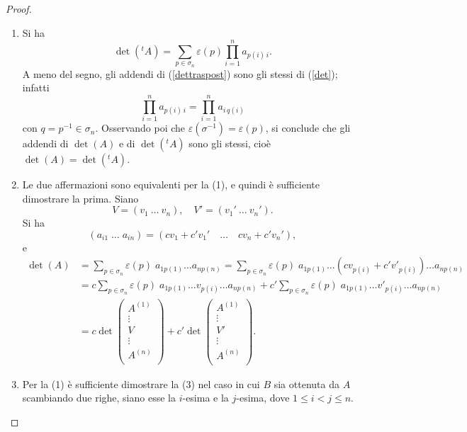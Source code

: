 \documentclass{article}
\theoremstyle{plain}
\theoremstyle{definition}
\theoremstyle{remark}
\begin{document}
\begin{proof}\hfill
    \begin{enumerate}
        \item Si ha 
        \begin{equation}\label{dettraspost}
            \det( ^{t}A)=\sum_{p\in\sigma_n}\varepsilon(p)\prod_{i=1}^{n}a_{p(i)\,i}.
        \end{equation}
        A meno del segno, gli addendi di (\ref{dettraspost}) sono gli stessi di (\ref{det}); infatti
        \[\prod_{i=1}^{n}a_{p(i)\,i}=\prod_{i=1}^{n}a_{i\,q(i)}\]
        con $q=p^{-1}\in\sigma_n$. 
        Osservando poi che $\varepsilon(\sigma^{-1})=\varepsilon(p)$, si conclude che gli addendi di $\det(A)$ e di $\det( ^{t}A)$ sono gli stessi, cioè $\det(A)=\det( ^{t}A)$.
        \item Le due affermazioni sono equivalenti per la (1), e quindi è sufficiente dimostrare la prima. 
        Siano 
        \[V=(v_1 \ \dots \ v_n), \quad V'=(v_1' \ \dots \ v_n').\]
        Si ha \[(a_{i1} \;  \dots \; a_{in})=(cv_1+c'v_1' \quad \dots \quad cv_n+c'v_n'),\]
        e
        \begin{align*}
            \det(A)&=\sum_{p\in\sigma_n}\varepsilon(p)\;a_{1p(1)}\dots a_{np(n)}=\sum_{p\in\sigma_n}\varepsilon(p)\;a_{1p(1)}\dots(cv_{p(i)}+c'v'_{p(i)})\dots a_{np(n)}\\
            &=c\sum_{p\in\sigma_n}\varepsilon(p)\;a_{1p(1)}\dots v_{p(i)}\dots a_{np(n)}+c'\sum_{p\in\sigma_n}\varepsilon(p)\;a_{1p(1)}\dots v'_{p(i)}\dots a_{np(n)}\\
            &=c\det\begin{pmatrix}
                A^{(1)}\\
                \vdots\\
                V\\
                \vdots\\
                A^{(n)}\\
            \end{pmatrix}+c'\det\begin{pmatrix}
                A^{(1)}\\
                \vdots\\
                V'\\
                \vdots\\
                A^{(n)}\\
            \end{pmatrix}.
        \end{align*}
        \item Per la (1) è sufficiente dimostrare la (3) nel caso in cui $B$ sia ottenuta da $A$ scambiando due righe, siano esse la $i$-esima e la $j$-esima, dove $1\leq i<j\leq n$.

\end{enumerate}
\end{proof}
\end{document}
